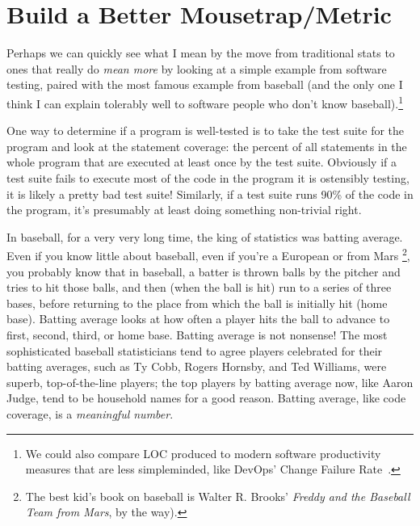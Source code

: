 \documentclass[sigplan,screen]{acmart}
\begin{document}
\section{Build a Better Mousetrap/Metric}

Perhaps we can quickly see what I mean by the move from traditional
stats to ones that really do \emph{mean more} by looking at a simple example from
software testing, paired with the most famous example from baseball
(and the only one I think I can explain tolerably well to software
people who don't know baseball).\footnote{We could also compare LOC produced to modern
software productivity measures that are less simpleminded, like DevOps' Change
Failure Rate~\cite{dora_cfr}.}

One way to determine if a program is well-tested is to take the test
suite for the program and look at the statement coverage: the percent
of all statements in the whole program that are executed at least once
by the test suite.  Obviously if a test suite fails to execute most of
the code in the program it is ostensibly testing, it is likely a
pretty bad test suite!  Similarly, if a test suite runs 90\% of the
code in the program, it’s presumably at least doing something
non-trivial right.

In baseball, for a very very long time, the king of statistics was
batting average.  Even if you know little
about baseball, even if you’re a European or from Mars \footnote{The best kid’s
book on baseball is Walter R. Brooks’ \emph{Freddy and the Baseball Team from Mars}, by the way).},
you probably know that in baseball, a batter is thrown balls by the
pitcher and tries to hit those balls, and then (when the ball is hit)
run to a series of three bases, before returning to the place from
which the ball is initially hit (home base).  Batting average looks at
how often a player hits the ball to advance to first, second, third,
or home base.  Batting average is not nonsense!  The most
sophisticated baseball statisticians tend to agree players celebrated
for their batting averages, such as Ty Cobb, Rogers Hornsby, and Ted
Williams, were superb, top-of-the-line players; the top players by
batting average now, like Aaron Judge, tend to be household names for
a good reason.  Batting average, like code
coverage, is a \emph{meaningful number}.
\end{document}
